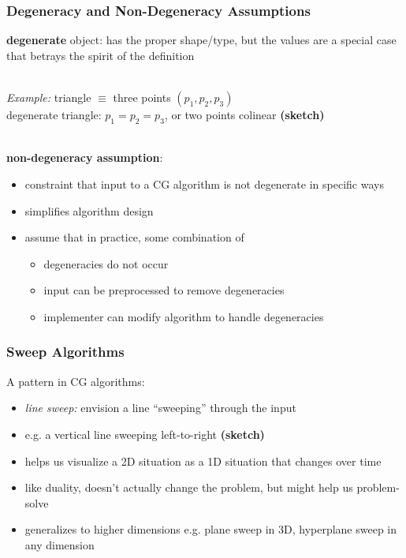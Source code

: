 \documentclass{beamer}
\newcommand{\stanza}{ \\~\ }
\begin{document}
\begin{frame} \frametitle{Degeneracy and Non-Degeneracy Assumptions}
\textbf{degenerate} object: has the proper shape/type, but the values are a
  special case that betrays the spirit of the definition \stanza

\emph{Example:} triangle $\equiv$ three points $(p_1, p_2, p_3)$ \\
degenerate triangle: $p_1=p_2=p_3$, or two points colinear  \textbf{(sketch)} \stanza

\textbf{non-degeneracy assumption}:
\begin{itemize}
  \item constraint that input to a CG algorithm is not degenerate in specific ways
  \item simplifies algorithm design
  \item assume that in practice, some combination of
  \begin{itemize}
    \item degeneracies do not occur
    \item input can be preprocessed to remove degeneracies
    \item implementer can modify algorithm to handle degeneracies
  \end{itemize}
\end{itemize}
\end{frame}

\begin{frame} \frametitle{Sweep Algorithms}
A pattern in CG algorithms:
\begin{itemize}
  \item \emph{line sweep:} envision a line ``sweeping'' through the input
  \item e.g. a vertical line sweeping left-to-right \textbf{(sketch)}
  \item helps us visualize a 2D situation as a 1D situation that changes over
    time
  \item like duality, doesn't actually change the problem, but might help us
    problem-solve
  \item generalizes to higher dimensions e.g. plane sweep in 3D, hyperplane sweep
    in any dimension
\end{itemize}
\end{frame}
\end{document}
